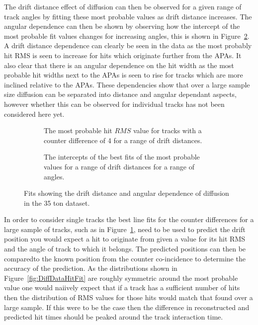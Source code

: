The drift distance effect of diffusion can then be observed for a given range of track angles by fitting these most probable values as drift distance increases. The angular dependence can then be shown by observing how the intercept of the most probable fit values changes for increasing angles, this is shown in Figure~\ref{fig:DiffDataFit}. A drift distance dependence can clearly be seen in the data as the most probably hit RMS is seen to increase for hits which originate further from the APAs. It also clear that there is an angular dependence on the hit width as the most probable hit widths next to the APAs is seen to rise for tracks which are more inclined relative to the APAs. These dependencies show that over a large sample size diffusion can be separated into distance and angular dependant aspects, however whether this can be observed for individual tracks has not been considered here yet. \\

\begin{figure}[h!]
  \centering
  \begin{subfigure}{0.45\textwidth}
    \centering
    \caption{The most probable hit $RMS$ value for tracks with a counter difference of 4 for a range of drift distances.}
    \label{fig:CDiff4DataFit}
  \end{subfigure}
  \hspace{0.08\textwidth}
  \begin{subfigure}{0.45\textwidth}
    \centering
    \caption{The intercepts of the best fits of the most probable values for a range of drift distances for a range of angles.}
  \end{subfigure}
  \caption[The drift distance and angular dependence of diffusion in the 35 ton data]
          {Fits showing the drift distance and angular dependence of diffusion in the 35 ton dataset.}
          \label{fig:DiffDataFit}
\end{figure}

In order to consider single tracks the best line fits for the counter differences for a large sample of tracks, such as in Figure~\ref{fig:CDiff4DataFit}, need to be used to predict the drift position you would expect a hit to originate from given a value for its hit RMS and the angle of track to which it belongs. The predicted positions can then be comparedto the known position from the counter co-incidence to determine the accuracy of the prediction. As the distributions shown in Figure~\ref{fig:DiffDataHitFit} are roughly symmetric around the most probable value one would naiively expect that if a track has a sufficient number of hits then the distribution of RMS values for those hits would match that found over a large sample. If this were to be the case then the difference in reconstructed and predicted hit times should be peaked around the track interaction time. \\

